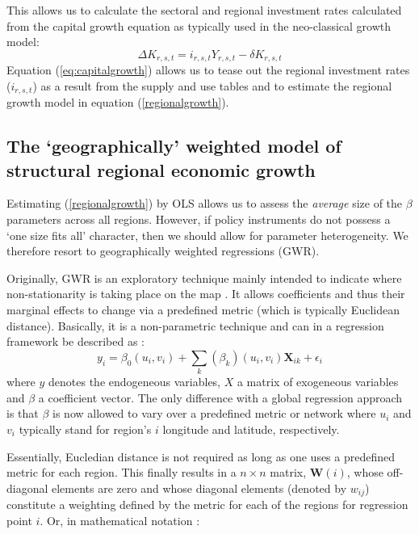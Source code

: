 \documentclass[11pt,parskip,abstracton,notitlepage, paper=a4]{scrartcl}
\begin{document}
This allows us to calculate the sectoral and regional investment rates calculated from the capital growth equation as typically used in the neo-classical growth model:
\begin{equation}
\Delta K_{r,s,t} = i_{r,s,t} Y_{r,s,t} - \delta K_{r,s,t}
\label{eq:capitalgrowth}
\end{equation}
Equation (\ref{eq:capitalgrowth}) allows us to tease out the regional investment rates ($i_{r,s,t}$) as a result from the supply and use tables and to estimate the regional growth model in equation (\ref{regionalgrowth}).

\subsection{The `geographically' weighted model of structural regional economic growth}

Estimating (\ref{regionalgrowth}) by OLS allows us to assess the \textit{average} size of the $\beta$ parameters across all regions. However, if policy instruments do not possess a `one size fits all' character, then we should allow for parameter heterogeneity. We therefore resort to geographically weighted regressions (GWR). 

Originally, GWR is an exploratory technique mainly intended to indicate where non-stationarity is taking place on the map \citep{bivand2014package}. It allows coefficients and thus their marginal effects to change via a predefined metric (which is typically Euclidean distance). Basically, it is a non-parametric technique and can in a regression framework be described as \citep[see for more details][]{fotheringham2003geographically}:
\begin{equation}
y_i = \beta_0(u_i, v_i) + \sum_k (\beta_k) (u_i, v_i) \mathbf{X}_{ik} + \epsilon_i
\label{eq:GWR}
\end{equation}
where $y$ denotes the endogeneous variables, $X$ a matrix of exogeneous variables and $\beta$ a coefficient vector. The only difference with a global regression approach is that $\beta$ is now allowed to vary over a predefined metric or network where $u_i$ and $v_i$ typically stand for region's $i$ longitude and latitude, respectively. 

Essentially, Eucledian distance is not required as long as one uses a predefined metric for each region. This finally results in a $n \times n$ matrix, $\mathbf{W}(i)$, whose off-diagonal elements are zero and whose diagonal elements (denoted by $w_{ij}$) constitute a weighting defined by the metric for each of the regions for regression point $i$. Or, in mathematical notation \citep[\textit{cf}.][]{fotheringham2003geographically}:
\end{document}
